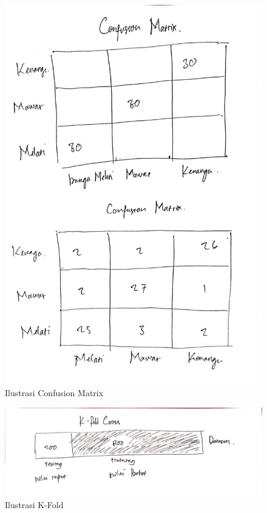 \begin{figure}[ht]
      \centerline{\includegraphics[width=1\textwidth]
      {figures/c15}}
      \caption{Ilustrasi Confusion Matrix}
      \label{c15}
      \end{figure}

\begin{figure}[ht]
      \centerline{\includegraphics[width=1\textwidth]
      {figures/c16}}
      \caption{Ilustrasi K-Fold}
      \label{c16}
      \end{figure}

